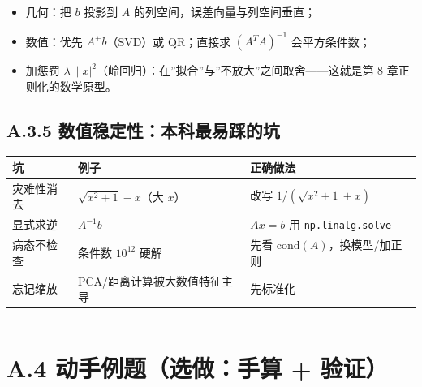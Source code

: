 \begin{itemize}
\tightlist
\item
  几何：把 \(b\) 投影到 \(A\) 的列空间，误差向量与列空间垂直；
\item
  数值：优先 \(A^{+}b\)（SVD）或 QR；直接求 \((A^TA)^{-1}\)
  会平方条件数；
\item
  加惩罚
  \(\lambda\|x|^2\)（岭回归）：在''拟合''与''不放大''之间取舍------这就是第
  8 章正则化的数学原型。
\end{itemize}

\subsection{A.3.5
数值稳定性：本科最易踩的坑}\label{a.3.5-ux6570ux503cux7a33ux5b9aux6027ux672cux79d1ux6700ux6613ux8e29ux7684ux5751}

{\def\LTcaptype{none} %
\begin{longtable}[]{@{}
  >{\raggedright\arraybackslash}p{}
  >{\raggedright\arraybackslash}p{}
  >{\raggedright\arraybackslash}p{}@{}}
\toprule\noalign{}
\begin{minipage}[b]{\linewidth}\raggedright
坑
\end{minipage} & \begin{minipage}[b]{\linewidth}\raggedright
例子
\end{minipage} & \begin{minipage}[b]{\linewidth}\raggedright
正确做法
\end{minipage} \\
\midrule\noalign{}
\endhead
\bottomrule\noalign{}
\endlastfoot
灾难性消去 & \(\sqrt{x^2+1}-x\)（大 \(x\)） & 改写
\(1/(\sqrt{x^2+1}+x)\) \\
显式求逆 & \(A^{-1}b\) & \(Ax=b\) 用 \texttt{np.linalg.solve} \\
病态不检查 & 条件数 \(10^{12}\) 硬解 & 先看
\(\mathrm{cond}(A)\)，换模型/加正则 \\
忘记缩放 & PCA/距离计算被大数值特征主导 & 先标准化 \\
\end{longtable}
}

\begin{center}\rule{0.5\linewidth}{0.5pt}\end{center}

\section{A.4 动手例题（选做：手算 +
验证）}\label{a.4-ux52a8ux624bux4f8bux9898ux9009ux505aux624bux7b97-ux9a8cux8bc1}

